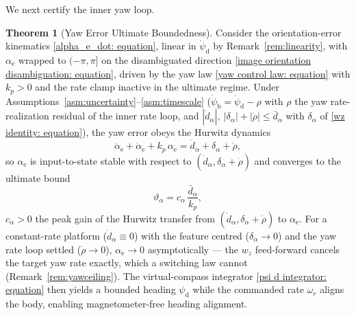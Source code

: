 \documentclass{IEEEtaes}
\theoremstyle{definition}
\newtheorem{theorem}{Theorem}
\theoremstyle{remark}
\begin{document}
We next certify the inner yaw loop.

\begin{theorem}[Yaw Error Ultimate Boundedness]\label{thm:yaw}
Consider the orientation-error kinematics \eqref{alpha_e_dot: equation}, linear in $\dot{\psi}_\text{d}$ by Remark~\ref{rem:linearity}, with $\alpha_\text{e}$ wrapped to $(-\pi,\pi]$ on the disambiguated direction \eqref{image orientation disambiguation: equation}, driven by the yaw law \eqref{yaw control law: equation} with $k_p>0$ and the rate clamp inactive in the ultimate regime. Under Assumptions~\ref{asm:uncertainty}--\ref{asm:timescale} ($\dot{\psi}_\text{b}=\dot{\psi}_\text{d}-\rho$ with $\rho$ the yaw rate-realization residual of the inner rate loop, and $|\dot{d}_\alpha|,\ |\delta_\alpha|+|\dot{\rho}|\le\bar{d}_\alpha$ with $\delta_\alpha$ of \eqref{wz identity: equation}), the yaw error obeys the Hurwitz dynamics
\begin{equation} \label{yaw error dynamics: equation}
    \ddot{\alpha}_\text{e} + \dot{\alpha}_\text{e} + k_p\,\alpha_\text{e} = \dot{d}_\alpha + \delta_\alpha + \dot{\rho},
\end{equation}
so $\alpha_\text{e}$ is input-to-state stable with respect to $(\dot{d}_\alpha,\delta_\alpha+\dot{\rho})$ and converges to the ultimate bound
\begin{equation} \label{yaw UUB bound: equation}
    \vartheta_\alpha = c_\alpha\,\frac{\bar{d}_\alpha}{k_p},
\end{equation}
$c_\alpha>0$ the peak gain of the Hurwitz transfer from $(\dot{d}_\alpha,\delta_\alpha+\dot{\rho})$ to $\alpha_\text{e}$. For a constant-rate platform ($\dot{d}_\alpha\equiv0$) with the feature centred ($\delta_\alpha\to0$) and the yaw rate loop settled ($\dot{\rho}\to0$), $\alpha_\text{e}\to0$ asymptotically --- the $w_z$ feed-forward cancels the target yaw rate exactly, which a switching law cannot (Remark~\ref{rem:yawceiling}). The virtual-compass integrator \eqref{psi d integrator: equation} then yields a bounded heading $\psi_\text{d}$ while the commanded rate $\omega_r$ aligns the body, enabling magnetometer-free heading alignment.
\end{theorem}
\end{document}
